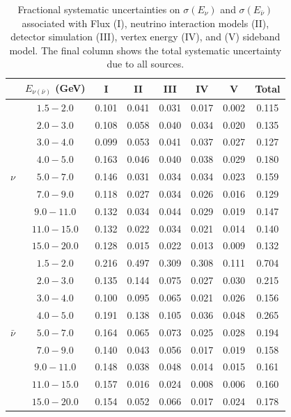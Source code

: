\documentclass[aps,prl,twocolumn,showpacs,superscriptaddress,nofootinbib]{revtex4}
\newcommand{\nubar}{\ensuremath{\bar{\nu}}}
\begin{document}
 \begingroup
 \squeezetable
 \begin{table}
 \begin{tabular}{lccccccc}
 &$E_{\nu(\nubar)}$ (GeV) & I & II & III & IV & V  &  Total \\
 \hline
&$1.5 - 2.0$ & 0.101 & 0.041 & 0.031 & 0.017 & 0.002 & 0.115\\ 
&$2.0 - 3.0$ & 0.108 & 0.058 & 0.040 & 0.034 & 0.020 & 0.135\\ 
&$3.0 - 4.0$ & 0.099 & 0.053 & 0.041 & 0.037 & 0.027 & 0.127\\ 
&$4.0 - 5.0$ & 0.163 & 0.046 & 0.040 & 0.038 & 0.029 & 0.180\\ 
$\nu$&$5.0 - 7.0$ & 0.146 & 0.031 & 0.034 & 0.034 & 0.023 & 0.159\\ 
&$7.0 - 9.0$ & 0.118 & 0.027 & 0.034 & 0.026 & 0.016 & 0.129\\ 
&$9.0 - 11.0$ & 0.132 & 0.034 & 0.044 & 0.029 & 0.019 & 0.147\\ 
&$11.0 - 15.0$ & 0.132 & 0.022 & 0.034 & 0.021 & 0.014 & 0.140\\ 
&$15.0 - 20.0$ & 0.128 & 0.015 & 0.022 & 0.013 & 0.009 & 0.132\\ 
\hline
&$1.5 - 2.0$ & 0.216 & 0.497 & 0.309 & 0.308 & 0.111 & 0.704\\ 
&$2.0 - 3.0$ & 0.135 & 0.144 & 0.075 & 0.027 & 0.030 & 0.215\\ 
&$3.0 - 4.0$ & 0.100 & 0.095 & 0.065 & 0.021 & 0.026 & 0.156\\ 
&$4.0 - 5.0$ & 0.191 & 0.138 & 0.105 & 0.036 & 0.048 & 0.265\\ 
$\bar{\nu}$&$5.0 - 7.0$ & 0.164 & 0.065 & 0.073 & 0.025 & 0.028 & 0.194\\ 
&$7.0 - 9.0$ & 0.140 & 0.043 & 0.056 & 0.017 & 0.019 & 0.158\\ 
&$9.0 - 11.0$ & 0.148 & 0.038 & 0.048 & 0.014 & 0.015 & 0.161\\ 
&$11.0 - 15.0$ & 0.157 & 0.016 & 0.024 & 0.008 & 0.006 & 0.160\\ 
&$15.0 - 20.0$ & 0.154 & 0.052 & 0.066 & 0.017 & 0.024 & 0.178\\ 

 \hline
 \end{tabular}
 \caption{Fractional systematic uncertainties on $\sigma(E_\nu)$ and $\sigma(E_{\nubar})$  associated with Flux (I), neutrino interaction models (II), detector simulation (III), vertex energy (IV), and (V) sideband model.  The final column shows the total systematic uncertainty due to all sources.}
 \label{tab:systematics} 
 \end{table}
 \endgroup
\end{document}
